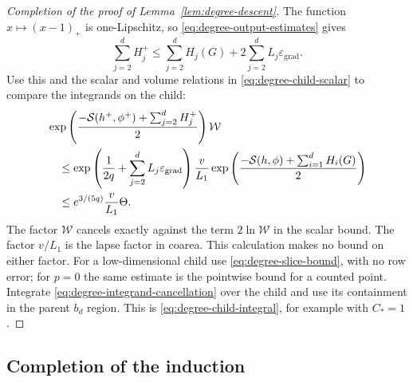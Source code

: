 \begin{proof}[Completion of the proof of Lemma~\ref{lem:degree-descent}]
The function $x\mapsto(x-1)_+$ is one-Lipschitz, so
\eqref{eq:degree-output-estimates} gives
\[
            \sum_{j=2}^dH_j^+\le\sum_{j=2}^dH_j(G)
                         +2\sum_{j=2}^dL_j\varepsilon_{\mathrm{grad}}.
\]
Use this and the scalar and volume relations in
\eqref{eq:degree-child-scalar} to compare the integrands on the child:
\begin{equation}\label{eq:degree-integrand-cancellation}
 \begin{split}
 &\exp\left(\frac{-\mathcal S(h^+,\phi^+)+\sum_{j=2}^dH_j^+}{2}\right)
                  \mathcal W\\
 &\quad\le
 \exp\left(\frac1{2q}+\sum_{j=2}^dL_j\varepsilon_{\mathrm{grad}}\right)
       \frac v{L_1}
       \exp\left(\frac{-\mathcal S(h,\phi)+\sum_{i=1}^dH_i(G)}2\right)\\
 &\quad\le e^{3/(5q)}\frac v{L_1}\Theta.
 \end{split}
\end{equation}
The factor $\mathcal W$ cancels exactly against the term
$2\ln\mathcal W$ in the scalar bound.  The factor $v/L_1$ is the lapse
factor in coarea.  This calculation makes no bound on either factor.
For a low-dimensional child use \eqref{eq:degree-slice-bound}, with no
row error; for $p=0$ the same estimate is the pointwise bound for a
counted point.  Integrate \eqref{eq:degree-integrand-cancellation} over
the child and use its containment in the parent $b_d$ region.  This is
\eqref{eq:degree-child-integral}, for example with $C_*=1$.
\end{proof}

\subsection{Completion of the induction}

